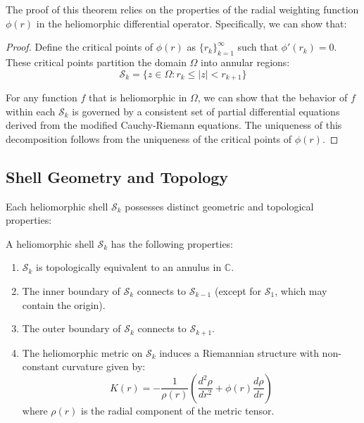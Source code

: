 The proof of this theorem relies on the properties of the radial weighting function $\phi(r)$ in the heliomorphic differential operator. Specifically, we can show that:

\begin{proof}
Define the critical points of $\phi(r)$ as $\{r_k\}_{k=1}^{\infty}$ such that $\phi'(r_k) = 0$. These critical points partition the domain $\Omega$ into annular regions:
\begin{equation}
\mathcal{S}_k = \{z \in \Omega : r_k \leq |z| < r_{k+1}\}
\end{equation}

For any function $f$ that is heliomorphic in $\Omega$, we can show that the behavior of $f$ within each $\mathcal{S}_k$ is governed by a consistent set of partial differential equations derived from the modified Cauchy-Riemann equations. The uniqueness of this decomposition follows from the uniqueness of the critical points of $\phi(r)$.
\end{proof}

\subsection{Shell Geometry and Topology}

Each heliomorphic shell $\mathcal{S}_k$ possesses distinct geometric and topological properties:

\begin{proposition}
A heliomorphic shell $\mathcal{S}_k$ has the following properties:
\begin{enumerate}
    \item $\mathcal{S}_k$ is topologically equivalent to an annulus in $\mathbb{C}$.
    \item The inner boundary of $\mathcal{S}_k$ connects to $\mathcal{S}_{k-1}$ (except for $\mathcal{S}_1$, which may contain the origin).
    \item The outer boundary of $\mathcal{S}_k$ connects to $\mathcal{S}_{k+1}$.
    \item The heliomorphic metric on $\mathcal{S}_k$ induces a Riemannian structure with non-constant curvature given by:
    \begin{equation}
    K(r) = -\frac{1}{\rho(r)}\left(\frac{d^2\rho}{dr^2} + \phi(r)\frac{d\rho}{dr}\right)
    \end{equation}
    where $\rho(r)$ is the radial component of the metric tensor.
\end{enumerate}
\end{proposition}

